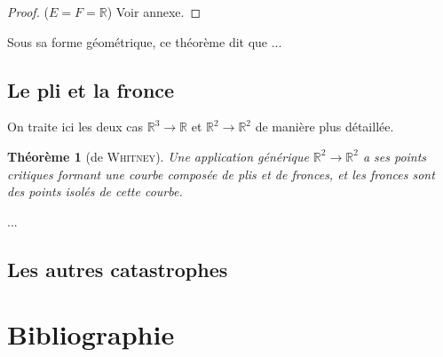 \documentclass{article}
\newcommand{\R}{\mathbb{R}}
\newtheorem{thm}{Théorème}
\theoremstyle{definition}
\begin{document}
\begin{proof}{($E=F=\R$)} Voir annexe. \end{proof}

Sous sa forme géométrique, ce théorème dit que ...

\subsection{Le pli et la fronce}

On traite ici les deux cas $\R^3\to\R$ et $\R^2\to\R^2$ de manière plus détaillée.

\begin{thm}[de \textsc{Whitney}]
	Une application générique $\R^2\to\R^2$ a ses points critiques formant une courbe composée de plis et de fronces, et les fronces sont des points isolés de cette courbe.
\end{thm}

...

\iffalse
On note qu'une variété de dimension $1$ est négligeable dans un espace de dimension deux: on en déduit le théorème de \textsc{Sard} dans ce cas particulier.
\fi

\subsection{Les autres catastrophes}

\section{Bibliographie}

\renewcommand\refname{\vskip -1cm}


\end{document}
